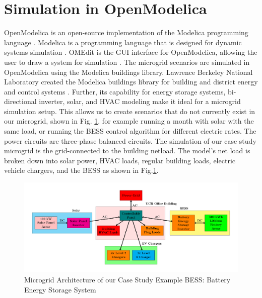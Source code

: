 \documentclass[conference]{IEEEtran}
\begin{document}
\section{Simulation in OpenModelica}
    	OpenModelica is an open-source implementation of the Modelica programming language \cite{OpenModelica}. Modelica is a programming language that is designed for dynamic systems simulation \cite{ModelicaLanguage}. OMEdit is the GUI interface for OpenModelica, allowing the user to draw a system for simulation \cite{OMEdit}. The microgrid scenarios are simulated in OpenModelica using the Modelica buildings library.  Lawrence Berkeley National Laboratory created the Modelica buildings library for building and district energy and control systems \cite{ModelicaBuildingsLibrary}. Further, its capability for energy storage systems, bi-directional inverter, solar, and HVAC modeling make it ideal for a microgrid simulation setup. This allows us to create scenarios that do not currently exist in our microgrid, shown in Fig. \ref{fig:powersystemsetupfull}, for example running a month with solar with the same load, or running the BESS control algorithm for different electric rates.  The power circuits are three-phase balanced circuits. The simulation of our case study microgrid is the grid-connected to the building netload. The model's net load is broken down into solar power, HVAC loads, regular building loads, electric vehicle chargers, and the BESS as shown in Fig.\ref{fig:powersystemsetupfull}.
	\begin{figure}
		\centering
		\includegraphics[width=\linewidth]{Fig/power_system_setup_modelica_large}
		\caption{\footnotesize Microgrid Architecture of our Case Study Example BESS: Battery Energy Storage System}
		\label{fig:powersystemsetupfull}
	\end{figure}
\end{document}
